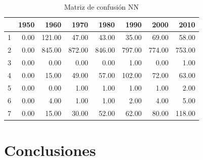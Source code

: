 \documentclass[conference,final,]{IEEEtran}
\begin{document}
\begin{table}[!t]
\centering
\caption{Matriz de confusión NN} 
\begin{tabular}{r|rrrrrrr}
  \hline
 & 1950 & 1960 & 1970 & 1980 & 1990 & 2000 & 2010 \\ 
  \hline
1 & 0.00 & 121.00 & 47.00 & 43.00 & 35.00 & 69.00 & 58.00 \\ 
  2 & 0.00 & 845.00 & 872.00 & 846.00 & 797.00 & 774.00 & 753.00 \\ 
  3 & 0.00 & 0.00 & 0.00 & 0.00 & 1.00 & 0.00 & 1.00 \\ 
  4 & 0.00 & 15.00 & 49.00 & 57.00 & 102.00 & 72.00 & 63.00 \\ 
  5 & 0.00 & 0.00 & 1.00 & 1.00 & 1.00 & 1.00 & 2.00 \\ 
  6 & 0.00 & 4.00 & 1.00 & 1.00 & 2.00 & 4.00 & 5.00 \\ 
  7 & 0.00 & 15.00 & 30.00 & 52.00 & 62.00 & 80.00 & 118.00 \\ 
   \hline
\end{tabular}
\end{table}

\hypertarget{conclusiones}{%
\section{Conclusiones}\label{conclusiones}}
\end{document}
